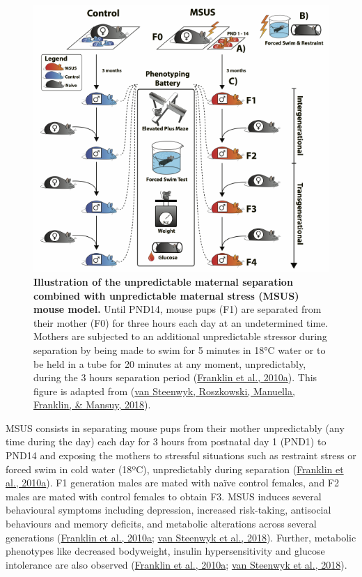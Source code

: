 \documentclass[12pt,twoside]{reedthesis}
\begin{document}
\begin{figure}[htbp]

{\centering \includegraphics{thesis_files/figure-latex/if4-1} 

}

\caption[MSUS paradigm]{\textbf{Illustration of the unpredictable maternal
separation combined with unpredictable maternal stress (MSUS) mouse
model.} Until PND14, mouse pups (F1) are separated from their mother
(F0) for three hours each day at an undetermined time. Mothers are
subjected to an additional unpredictable stressor during separation by
being made to swim for 5 minutes in 18°C water or to be held in a tube
for 20 minutes at any moment, unpredictably, during the 3 hours
separation period (\protect\hyperlink{ref-franklin2010}{Franklin et al., 2010a}). This figure is adapted from
(\protect\hyperlink{ref-vansteenwyk2018}{van Steenwyk, Roszkowski, Manuella, Franklin, \& Mansuy, 2018}).}\label{fig:if4}
\end{figure}
MSUS consists in separating mouse pups from their mother unpredictably
(any time during the day) each day for 3 hours from postnatal day 1
(PND1) to PND14 and exposing the mothers to stressful situations such as
restraint stress or forced swim in cold water (18ºC), unpredictably
during separation (\protect\hyperlink{ref-franklin2010}{Franklin et al., 2010a}). F1 generation males are mated with
naïve control females, and F2 males are mated with control females to
obtain F3. MSUS induces several behavioural symptoms including
depression, increased risk-taking, antisocial behaviours and memory
deficits, and metabolic alterations across several generations
(\protect\hyperlink{ref-franklin2010}{Franklin et al., 2010a}; \protect\hyperlink{ref-vansteenwyk2018}{van Steenwyk et al., 2018}). Further, metabolic phenotypes like
decreased bodyweight, insulin hypersensitivity and glucose intolerance
are also observed (\protect\hyperlink{ref-franklin2010}{Franklin et al., 2010a}; \protect\hyperlink{ref-vansteenwyk2018}{van Steenwyk et al., 2018}).
\end{document}
